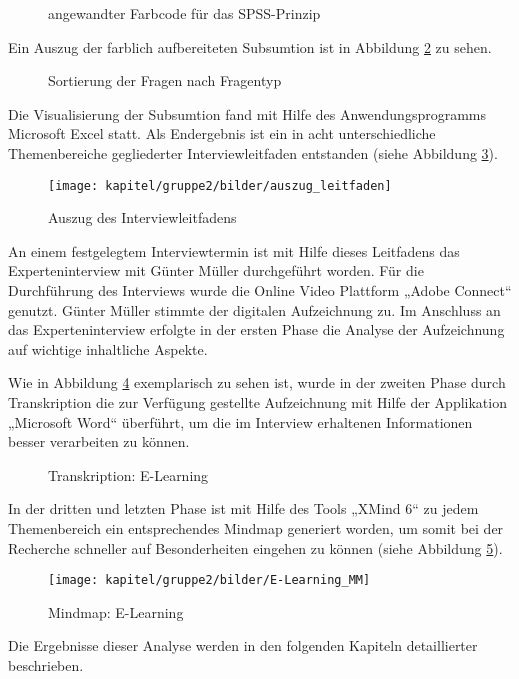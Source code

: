 \begin{figure}[h]
	\centering
	\caption{angewandter Farbcode für das SPSS-Prinzip}
	\label{fig_farbcode_SPSS}
\end{figure}

Ein Auszug der farblich aufbereiteten Subsumtion ist in Abbildung \ref{fig_sortierung_fragentyp} zu sehen.

\begin{figure}[h]
	\centering
	\caption{Sortierung der Fragen nach Fragentyp}
	\label{fig_sortierung_fragentyp}
\end{figure}
\clearpage
Die Visualisierung der Subsumtion fand mit Hilfe des Anwendungsprogramms Microsoft Excel statt. Als Endergebnis ist ein in acht unterschiedliche Themenbereiche gegliederter Interviewleitfaden entstanden (siehe Abbildung \ref{fig_auszug_interviewleitfaden}).

\begin{figure}[h!]
	\centering
	\texttt{[image: kapitel/gruppe2/bilder/auszug\_leitfaden]}
	\caption{Auszug des Interviewleitfadens}
	\label{fig_auszug_interviewleitfaden}
\end{figure}


An einem festgelegtem Interviewtermin ist mit Hilfe dieses Leitfadens das Experteninterview mit Günter Müller durchgeführt worden. Für die Durchführung des Interviews wurde die Online Video Plattform „Adobe Connect“ genutzt. Günter Müller stimmte der digitalen Aufzeichnung zu. Im Anschluss an das Experteninterview erfolgte in der ersten Phase die Analyse der Aufzeichnung auf wichtige inhaltliche Aspekte.

Wie in Abbildung \ref{fig_E-Learning_Transkription} exemplarisch zu sehen ist, wurde in der zweiten Phase durch Transkription die zur Verfügung gestellte Aufzeichnung mit Hilfe der Applikation „Microsoft Word“ überführt, um die im Interview erhaltenen Informationen besser verarbeiten zu können.

\begin{figure}[h!]
	\centering
	\caption{Transkription: E-Learning}
	\label{fig_E-Learning_Transkription}
\end{figure}
\clearpage

In der dritten und letzten Phase ist mit Hilfe des Tools „XMind 6“ zu jedem Themenbereich ein entsprechendes Mindmap generiert worden, um somit bei der Recherche schneller auf Besonderheiten eingehen zu können  (siehe Abbildung \ref{fig_E-Learning_MM}).

\begin{figure}[h!]
	\centering
	\texttt{[image: kapitel/gruppe2/bilder/E-Learning\_MM]}
	\caption{Mindmap: E-Learning}
	\label{fig_E-Learning_MM}
\end{figure}

Die Ergebnisse dieser Analyse werden in den folgenden Kapiteln detaillierter beschrieben. 